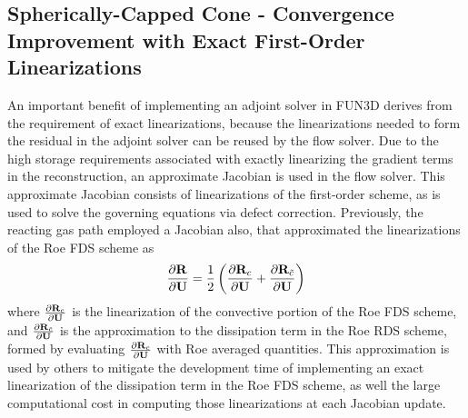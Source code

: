 \subsection{Spherically-Capped Cone - Convergence Improvement with Exact First-Order Linearizations}
\label{sec:sphere-cone-exact-approx-convergence}

An important benefit of implementing an adjoint solver in FUN3D derives from the
requirement of exact linearizations, because the linearizations needed to form
the residual in the adjoint solver can be reused by the flow solver.
Due to the high storage requirements associated with exactly linearizing the
gradient terms in the reconstruction, an approximate Jacobian is used in the
flow solver.  This approximate Jacobian consists of linearizations of the
first-order scheme, as is used to solve the governing equations via defect
correction.  Previously, the reacting gas path employed a Jacobian also, that
approximated the linearizations of the Roe FDS scheme\cite{gnoffo-tp} as
\begin{equation}
  \frac{\partial \mathbf R_{}}{\partial \mathbf U} = 
  \frac{1}{2} \left( \frac{\partial \mathbf R_{c}}{\partial \mathbf U} + \frac{\partial \mathbf R_{\tilde{c}}}{\partial \mathbf U} \right)
  \label{approx-roe-jac}
\end{equation}
where $\frac{\partial \mathbf R_{c}}{\partial \mathbf U}$ is the linearization of the convective portion of the Roe
FDS scheme, and $\frac{\partial \mathbf R_{\tilde{c}}}{\partial \mathbf U}$ is the approximation to the dissipation
term in the Roe RDS scheme, formed by evaluating $\frac{\partial \mathbf R_{c}}{\partial \mathbf U}$ with Roe
averaged quantities.  This approximation is used by others
\cite{rinaldi2014exact} to mitigate the development time of implementing an
exact linearization of the dissipation term in the Roe FDS scheme, as well the
large computational cost in computing those linearizations at each Jacobian
update.

